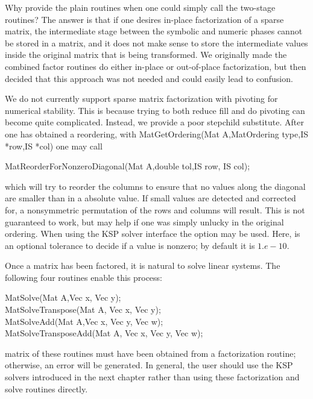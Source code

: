 {{{Why provide the plain  routines when one could simply 
call the two-stage routines? The answer is that if one desires in-place 
factorization of a sparse matrix, the intermediate stage between the 
symbolic and numeric phases cannot be stored in a  matrix, and
it does not make sense to store the intermediate values
inside the original matrix 
that is being transformed.  We originally made the combined factor routines
do either in-place or out-of-place factorization, but then decided that 
this approach was not needed and could easily lead to confusion.

We do not currently support sparse matrix factorization with pivoting
for numerical stability. This is because trying to both reduce fill
and do pivoting can become quite complicated. Instead, we provide a 
poor stepchild substitute. After one has obtained a reordering, with
MatGetOrdering(Mat A,MatOrdering type,IS *row,IS *col) one
may call
\begin{tabbing}
  MatReorderForNonzeroDiagonal(Mat A,double tol,IS row, IS col);
\end{tabbing}
which will try to reorder the columns to ensure that no values along 
the diagonal are smaller than  in a absolute value. If small 
values are detected and corrected for, a nonsymmetric
permutation of the rows and columns will result. This is not guaranteed to work, 
but may help if one was simply unlucky in the original ordering.
When using the KSP solver interface
the option  
may be used.  Here, 
is an optional tolerance to decide if a value is nonzero; by default it
is $ 1.e-10.$ 

Once a matrix has been factored, it is natural to solve linear systems.
The following four routines enable this process:  
\begin{tabbing}
  MatSolve(Mat A,Vec x, Vec y);\\
  MatSolveTranspose(Mat A, Vec x, Vec y);\\
  MatSolveAdd(Mat A,Vec x, Vec y, Vec w);\\
  MatSolveTransposeAdd(Mat A, Vec x, Vec y, Vec w);
\end{tabbing}
matrix
 of these routines must have been obtained from a 
factorization routine; otherwise, an error will be generated.
In general, the user should use the KSP solvers introduced in the 
next chapter rather than using these factorization and solve routines
directly.

}}}
